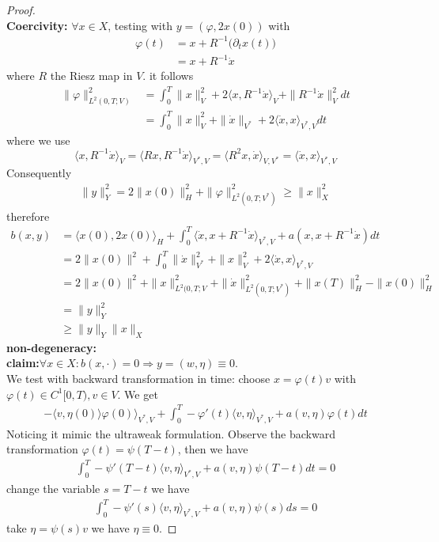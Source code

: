 \documentclass[a4paper,12pt,oneside,fleqn]{book}
\theoremstyle{definition}
\theoremstyle{remark}
\begin{document}
\begin{proof}
\quad\\
\textbf{Coercivity:}
$\forall x \in X$, testing with $y = (\varphi, 2 x(0))$ with 
\begin{align*}
	\varphi(t) &= x + R^{-1}\bigg( \partial_t  x (t) \bigg)\\
	&= x + R^{-1} \dot{x} 
\end{align*}
where $R$ the Riesz map in $V$. 
it follows
\begin{align*}
	\|\varphi\|_{L^2(0, T; V)}^2 &= 
	\int_0^T \| x\|_V^2 + 2 \langle x, R^{-1} \dot{x} \rangle_V + \|R^{-1} \dot{x} \|_V^2 dt \\
	&= \int_0^T \|x\|_V^2 + \|\dot{x}\|_{V^*} + 2\langle \dot{x}, x \rangle_{V^*, V} dt 
\end{align*}
where we use
\begin{equation}
	\langle x, R^{-1} \dot{x} \rangle_{V} = \langle Rx, R^{-1} \dot{x} \rangle_{V^*, V} 
	= \langle R^2 x, \dot{x} \rangle_{V, V^*} = \langle \dot{x}, x \rangle_{V^*, V}
\end{equation}
Consequently
\begin{align*}
	\|y\|_Y^2  = 2\|x(0)\|_H^2 + \|\varphi\|^2_{L^2(0, T;V^*)} 
	\ge \|x\|_X^2
\end{align*}
therefore
\begin{align*}
	b(x, y) &= \langle x(0), 2 x(0) \rangle_H + \int_0^T \langle \dot{x}, x + R^{-1} \dot{x} \rangle_{V^*, V} + a( x, x + R^{-1} \dot{x} ) dt \\
	&= 2\|x(0)\|^2 + \int_0^T \|\dot{x}\|_{V^*}^2 + \|x\|_V^2 + 2 \langle \dot{x}, x \rangle_{V^*, V}\\
	&= 2\|x(0)\|^2 + \|x\|_{L^2(0, T;V}^2 + \|\dot{x}\|_{L^2(0, T; V^*)}^2 + \|x(T)\|_H^2 - \|x(0)\|_H^2 \\
	&= \|y\|_Y^2 \\
	&\ge \|y\|_Y \|x\|_X
\end{align*}
\textbf{non-degeneracy:}\\
\textbf{claim:}$ \forall x \in X: b(x, \cdot) = 0 \Rightarrow y = (w, \eta) \equiv 0$.\\
We test with backward transformation in time: choose $x = \varphi(t) v$ with $\varphi(t) \in C^1[0, T), v \in V$. We get 
\begin{align*}
	- \langle v, \eta(0)\rangle \varphi(0) \rangle_{V^*, V} +  \int_0^T - \varphi'(t) \langle v, \eta \rangle_{V^*, V}
	+ a(v, \eta) \varphi(t) dt
\end{align*}
Noticing it mimic the ultraweak formulation. Observe the backward transformation $\varphi(t) = \psi(T - t)$, then we have
\begin{align*}
	\int_0^T - \psi'(T - t) \langle v, \eta\rangle_{V^*, V} + a(v, \eta) \psi(T - t)dt  = 0
\end{align*}
change the variable $s = T -t$ we have
\begin{align*}
	\int_0^T -\psi'(s)\langle v, \eta \rangle_{V^*, V} + a(v, \eta) \psi(s) ds = 0
\end{align*}
take $\eta = \psi(s) v$ we have $\eta \equiv 0$. 
	
\end{proof}
\end{document}
